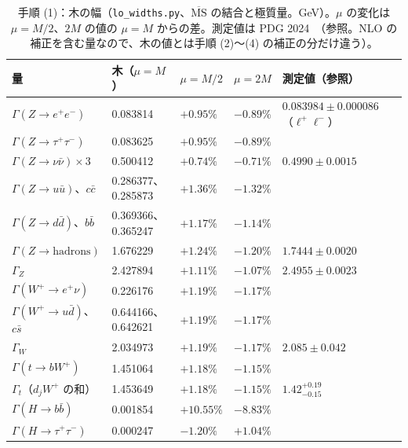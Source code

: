 \documentclass[a4paper,10pt]{ltjsarticle}
\newcommand{\MSbar}{\overline{\mathrm{MS}}}
\begin{document}
\begin{table}[tbp]
\centering\small
\caption{手順 (1)：木の幅（\texttt{lo\_widths.py}、$\MSbar$ の結合と極質量。GeV）。$\mu$ の変化は $\mu=M/2$、$2M$ の値の $\mu=M$ からの差。測定値は PDG 2024~\cite{pdg24}（参照。NLO の補正を含む量なので、木の値とは手順 (2)〜(4) の補正の分だけ違う）。}
\label{tab:lo}
\begin{tabular}{llllll}
\toprule
量 & 木（$\mu=M$） & $\mu=M/2$ & $\mu=2M$ & 測定値（参照） \\
\midrule
$\Gamma(Z\to e^+e^-)$ & 0.083814 & $+0.95\%$ & $-0.89\%$ & $0.083984\pm0.000086$（$\ell^+\ell^-$） \\
$\Gamma(Z\to\tau^+\tau^-)$ & 0.083625 & $+0.95\%$ & $-0.89\%$ & \\
$\Gamma(Z\to\nu\bar\nu)\times3$ & 0.500412 & $+0.74\%$ & $-0.71\%$ & $0.4990\pm0.0015$ \\
$\Gamma(Z\to u\bar u)$、$c\bar c$ & 0.286377、0.285873 & $+1.36\%$ & $-1.32\%$ & \\
$\Gamma(Z\to d\bar d)$、$b\bar b$ & 0.369366、0.365247 & $+1.17\%$ & $-1.14\%$ & \\
$\Gamma(Z\to\mathrm{hadrons})$ & 1.676229 & $+1.24\%$ & $-1.20\%$ & $1.7444\pm0.0020$ \\
$\Gamma_Z$ & 2.427894 & $+1.11\%$ & $-1.07\%$ & $2.4955\pm0.0023$ \\
\midrule
$\Gamma(W^+\to e^+\nu)$ & 0.226176 & $+1.19\%$ & $-1.17\%$ & \\
$\Gamma(W^+\to u\bar d)$、$c\bar s$ & 0.644166、0.642621 & $+1.19\%$ & $-1.17\%$ & \\
$\Gamma_W$ & 2.034973 & $+1.19\%$ & $-1.17\%$ & $2.085\pm0.042$ \\
\midrule
$\Gamma(t\to bW^+)$ & 1.451064 & $+1.18\%$ & $-1.15\%$ & \\
$\Gamma_t$（$d_jW^+$ の和） & 1.453649 & $+1.18\%$ & $-1.15\%$ & $1.42^{+0.19}_{-0.15}$ \\
\midrule
$\Gamma(H\to b\bar b)$ & 0.001854 & $+10.55\%$ & $-8.83\%$ & \\
$\Gamma(H\to\tau^+\tau^-)$ & 0.000247 & $-1.20\%$ & $+1.04\%$ & \\
\bottomrule
\end{tabular}
\end{table}
\end{document}
